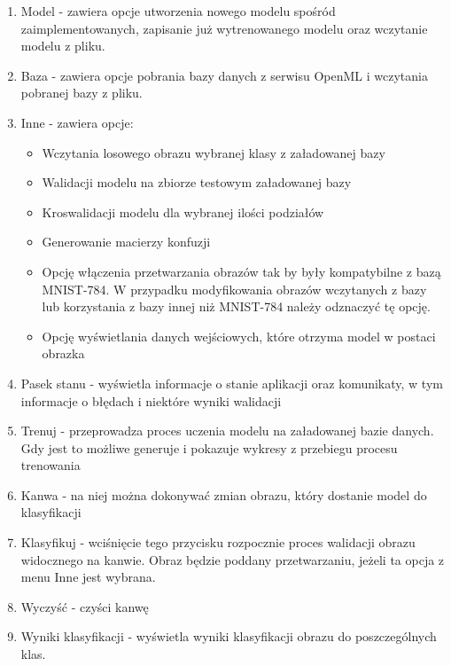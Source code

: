 \documentclass{article}
\begin{document}
\begin{enumerate}
    \item Model - zawiera opcje utworzenia
     nowego modelu spośród zaimplementowanych,
     zapisanie już wytrenowanego modelu oraz wczytanie 
     modelu z pliku.
    \item Baza - zawiera opcje pobrania bazy danych
     z serwisu OpenML i wczytania pobranej bazy z pliku.
    
    \item Inne - zawiera opcje:
        \begin{itemize}
            \item Wczytania losowego obrazu wybranej klasy z załadowanej bazy
            \item Walidacji modelu na zbiorze testowym załadowanej bazy
            \item Kroswalidacji modelu dla wybranej ilości podziałów
            \item Generowanie macierzy konfuzji
            \item Opcję włączenia przetwarzania obrazów tak by były kompatybilne z bazą MNIST-784. W przypadku modyfikowania obrazów wczytanych z bazy lub korzystania z bazy innej niż MNIST-784 należy odznaczyć tę opcję.
            \item Opcję wyświetlania danych wejściowych, które otrzyma model w postaci obrazka
        \end{itemize}

    \item Pasek stanu - wyświetla informacje o stanie aplikacji oraz komunikaty, w tym informacje o błędach i niektóre wyniki walidacji
    \item Trenuj - przeprowadza proces uczenia modelu na załadowanej bazie danych. Gdy jest to możliwe generuje i pokazuje wykresy z przebiegu procesu trenowania
    \item Kanwa - na niej można dokonywać zmian obrazu, który dostanie model do klasyfikacji
    \item Klasyfikuj - wciśnięcie tego przycisku rozpocznie proces walidacji obrazu widocznego na kanwie. Obraz będzie poddany przetwarzaniu, jeżeli ta opcja z menu Inne jest wybrana.
    \item Wyczyść - czyści kanwę
    \item Wyniki klasyfikacji - wyświetla wyniki klasyfikacji obrazu do poszczególnych klas.
\end{enumerate}
\end{document}
